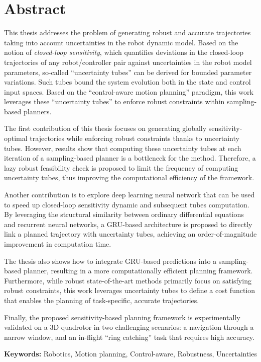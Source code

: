 \chapter*{Abstract}

This thesis addresses the problem of generating robust and accurate trajectories taking into account uncertainties in the robot dynamic model. 
Based on the notion of \emph{closed-loop sensitivity}, which quantifies deviations in the closed-loop trajectories of any robot/controller pair against uncertainties in the robot model parameters, so-called ``uncertainty tubes'' can be derived for bounded parameter variations.
Such tubes bound the system evolution both in the state and control input spaces.
Based on the ``control-aware motion planning'' paradigm, this work leverages these ``uncertainty tubes'' to enforce robust constraints within sampling-based planners.

The first contribution of this thesis focuses on generating globally sensitivity-optimal trajectories while enforcing robust constraints thanks to uncertainty tubes.
However, results show that computing these uncertainty tubes at each iteration of a sampling-based planner is a bottleneck for the method.
Therefore, a lazy robust feasibility check is proposed to limit the frequency of computing uncertainty tubes, thus improving the computational efficiency of the framework.

Another contribution is to explore deep learning neural network that can be used to speed up closed-loop sensitivity dynamic and subsequent tubes computation.
By leveraging the structural similarity between ordinary differential equations and recurrent neural networks, a GRU-based architecture is proposed to directly link a planned trajectory with uncertainty tubes, achieving an order-of-magnitude improvement in computation time.

The thesis also shows how to integrate GRU-based predictions into a sampling-based planner, resulting in a more computationally efficient planning framework. 
Furthermore, while robust state-of-the-art methods primarily focus on satisfying robust constraints, this work leverages uncertainty tubes to define a cost function that enables the planning of task-specific, accurate trajectories.

Finally, the proposed sensitivity-based planning framework is experimentally validated on a 3D quadrotor in two challenging scenarios: a navigation through a narrow window, and an in-flight ``ring catching'' task that requires high accuracy. 

\textbf{Keywords:} Robotics, Motion planning, Control-aware, Robustness, Uncertainties